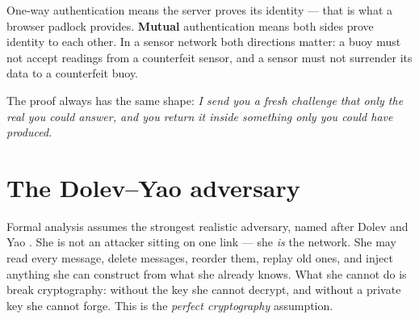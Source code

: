 One-way authentication means the server proves its identity --- that is what a browser
padlock provides. \textbf{Mutual} authentication means both sides prove identity to each
other. In a sensor network both directions matter: a buoy must not accept readings from a
counterfeit sensor, and a sensor must not surrender its data to a counterfeit buoy.

The proof always has the same shape: \emph{I send you a fresh challenge that only the real
you could answer, and you return it inside something only you could have produced.}

\section{The Dolev--Yao adversary}

Formal analysis assumes the strongest realistic adversary, named after Dolev and Yao
\cite{dolevyao}. She is not an attacker sitting on one link --- she \emph{is} the network.
She may read every message, delete messages, reorder them, replay old ones, and inject
anything she can construct from what she already knows. What she cannot do is break
cryptography: without the key she cannot decrypt, and without a private key she cannot
forge. This is the \emph{perfect cryptography} assumption.

